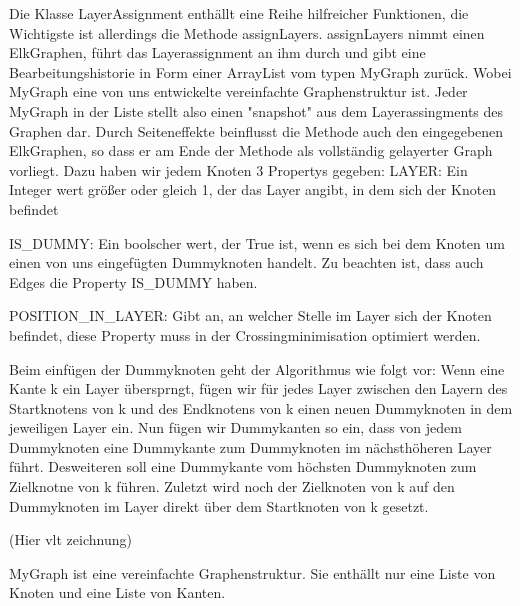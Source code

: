 \documentclass[a4paper,10pt]{scrartcl}
\begin{document}
Die Klasse LayerAssignment enthällt eine Reihe hilfreicher Funktionen, die Wichtigste ist allerdings die Methode assignLayers. assignLayers nimmt einen ElkGraphen, führt das Layerassignment an ihm durch und gibt eine Bearbeitungshistorie in Form einer ArrayList vom typen MyGraph zurück. Wobei MyGraph eine von uns entwickelte vereinfachte Graphenstruktur ist. Jeder MyGraph in der Liste stellt also einen "snapshot" aus dem Layerassingments des Graphen dar.
Durch Seiteneffekte beinflusst die Methode auch den eingegebenen ElkGraphen, so dass er am Ende der Methode als vollständig gelayerter Graph vorliegt. Dazu haben wir jedem Knoten 3 Propertys gegeben:
 LAYER: Ein Integer wert größer oder gleich 1, der das Layer angibt, in dem sich der Knoten befindet

IS_DUMMY: Ein boolscher wert, der True ist, wenn es sich bei dem Knoten um einen von uns eingefügten Dummyknoten handelt. Zu beachten ist, dass auch Edges die Property IS_DUMMY haben.

POSITION_IN_LAYER: Gibt an, an welcher Stelle im Layer sich der Knoten befindet, diese Property muss in der Crossingminimisation optimiert werden.

Beim einfügen der Dummyknoten geht der Algorithmus wie folgt vor:
Wenn eine Kante k ein Layer übersprngt, fügen wir für jedes Layer zwischen den Layern des Startknotens von k und des Endknotens von k einen neuen Dummyknoten in dem jeweiligen Layer ein. Nun fügen wir Dummykanten so ein, dass von jedem Dummyknoten eine Dummykante zum Dummyknoten im nächsthöheren Layer führt. Desweiteren soll eine Dummykante vom höchsten Dummyknoten zum Zielknotne von k führen. Zuletzt wird noch der Zielknoten von k auf den Dummyknoten im Layer direkt über dem Startknoten von k gesetzt.

(Hier vlt zeichnung)


MyGraph ist eine vereinfachte Graphenstruktur. Sie enthällt nur eine Liste von Knoten und eine Liste von Kanten.  
\end{document}
